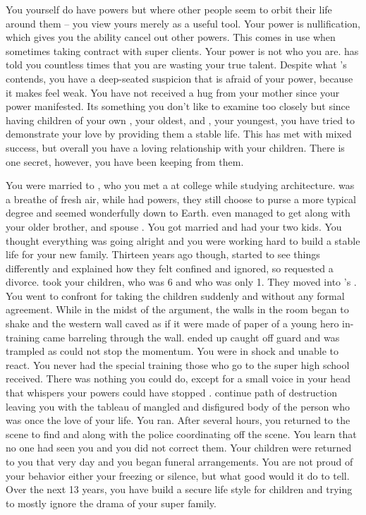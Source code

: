 \documentclass[char]{LRSguildcamp1}
\begin{document}
You yourself do have powers but where other people seem to orbit their life around them -- you view yours merely as a useful tool. Your power is nullification, which gives you the ability cancel out other powers. This comes in use when sometimes taking contract with super clients. Your power is not who you are. \cGrandma{} has told you countless times that you are wasting your true talent. Despite what \cGrandma{} 's contends, you have a deep-seated suspicion that \cGrandma{\they} is afraid of your power, because it makes \cGrandma{\them} feel weak. You have not received a hug from your mother since your power manifested. Its something you don't like to examine too closely but since having children of your own \cTeen{}, your oldest, and \cTween{}, your youngest, you have tried to demonstrate your love by providing them a stable life. This has met with mixed success, but overall you have a loving relationship with your children.  There is one secret, however, you have been keeping from them. 

You were married to \cAS{}, who you met a at college while studying architecture. \cAS{} was a breathe of fresh air, while \cAS{\they} had powers, they still choose to purse a more typical degree and seemed wonderfully down to Earth. \cAS{} even managed to get along with your older brother, \cOldest{} and \cOldest{\their} spouse \cOS{}. You got married and had your two kids. You thought everything was going alright and you were working hard to build a stable life for your new family.  Thirteen years ago though, \cAS{} started to see things differently and \cAS{\they} explained how they felt confined and ignored, so requested a divorce. \cAS{} took your children, \cTeen{} who was 6 and \cTween{} who was only 1. They moved into \cOldest{}'s . You went to confront \cAS{} for taking the children suddenly and without any formal agreement.  While in the midst of the argument, the walls in the room began to shake and the western wall caved as if it were made of paper of a young hero in-training \cJuggernaut{} came barreling through the wall. ended up caught off guard and was trampled as \cJuggernaut{} could not stop the momentum. You were in shock and unable to react. You never had the special training those who go to the super high school received. There was nothing you could do, except for a small voice in your head that whispers your powers could have stopped \cJuggernaut{}. \cJuggernaut{} continue  path of destruction leaving you with the tableau of mangled and disfigured body of the person who was once the love of your life. You ran. After several hours, you returned to the scene to find \cOS{} and \cOldest{} along with the police coordinating off the scene. You learn that no one had seen you and you did not correct them. Your children were returned to you that very day and you began funeral arrangements. You are not proud of your behavior either your freezing or silence, but what good would it do to tell. Over the next 13 years, you have build a secure life style for children and trying to mostly ignore the drama of your super family. 
\end{document}
